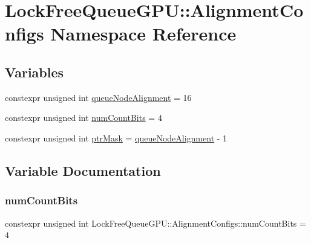 \hypertarget{namespace_lock_free_queue_g_p_u_1_1_alignment_configs}{}\section{Lock\+Free\+Queue\+G\+PU\+:\+:Alignment\+Configs Namespace Reference}
\label{namespace_lock_free_queue_g_p_u_1_1_alignment_configs}
\subsection*{Variables}
\begin{DoxyCompactItemize}
\item 
constexpr unsigned int \mbox{\hyperlink{namespace_lock_free_queue_g_p_u_1_1_alignment_configs_a787a4f09ac6aab7a3f4f822b981e58ab}{queue\+Node\+Alignment}} = 16
\item 
constexpr unsigned int \mbox{\hyperlink{namespace_lock_free_queue_g_p_u_1_1_alignment_configs_a1f35ad1d068c4d9e10ec8e9f1cfa06b2}{num\+Count\+Bits}} = 4
\item 
constexpr unsigned int \mbox{\hyperlink{namespace_lock_free_queue_g_p_u_1_1_alignment_configs_a144c3b9d88eb1fa121571c23e8adc819}{ptr\+Mask}} = \mbox{\hyperlink{namespace_lock_free_queue_g_p_u_1_1_alignment_configs_a787a4f09ac6aab7a3f4f822b981e58ab}{queue\+Node\+Alignment}} -\/ 1
\end{DoxyCompactItemize}


\subsection{Variable Documentation}
\mbox{\label{namespace_lock_free_queue_g_p_u_1_1_alignment_configs_a1f35ad1d068c4d9e10ec8e9f1cfa06b2}} 
\subsubsection{\texorpdfstring{num\+Count\+Bits}{numCountBits}}
{\footnotesize\ttfamily constexpr unsigned int Lock\+Free\+Queue\+G\+P\+U\+::\+Alignment\+Configs\+::num\+Count\+Bits = 4}

